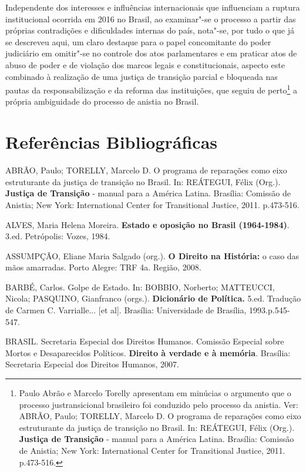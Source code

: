 Independente dos interesses e influências internacionais que influenciam
a ruptura institucional ocorrida em 2016 no Brasil, ao examinar"-se o
processo a partir das próprias contradições e dificuldades internas do
país, nota"-se, por tudo o que já se descreveu aqui, um claro destaque
para o papel concomitante do poder judiciário em omitir"-se no controle
dos atos parlamentares e em praticar atos de abuso de poder e de
violação dos marcos legais e constitucionais, aspecto este combinado à
realização de uma justiça de transição parcial e bloqueada nas pautas da
responsabilização e da reforma das instituições, que seguiu de
perto\footnote{Paulo Abrão e Marcelo Torelly apresentam em minúcias o
  argumento que o processo justransicional brasileiro foi conduzido pelo
  processo da anistia. Ver: ABRÃO, Paulo; TORELLY, Marcelo D. O programa
  de reparações como eixo estruturante da justiça de transição no
  Brasil. In: REÁTEGUI, Félix (Org.). \textbf{Justiça de Transição} -
  manual para a América Latina. Brasília: Comissão de Anistia; New York:
  International Center for Transitional Justice, 2011. p.473-516.} a
própria ambiguidade do processo de anistia no Brasil.

\section{Referências Bibliográficas}

ABRÃO, Paulo; TORELLY, Marcelo D. O programa de reparações como eixo
estruturante da justiça de transição no Brasil. In: REÁTEGUI, Félix
(Org.). \textbf{Justiça de Transição} - manual para a América Latina.
Brasília: Comissão de Anistia; New York: International Center for
Transitional Justice, 2011. p.473-516.

ALVES, Maria Helena Moreira. \textbf{Estado e oposição no Brasil
(1964-1984)}. 3.ed. Petrópolis: Vozes, 1984.

ASSUMPÇÃO, Eliane Maria Salgado (org.). \textbf{O Direito na História:}
o caso das mãos amarradas. Porto Alegre: TRF 4a. Região, 2008.

BARBÉ, Carlos. Golpe de Estado. In: BOBBIO, Norberto; MATTEUCCI, Nicola;
PASQUINO, Gianfranco (orgs.). \textbf{Dicionário de Política.} 5.ed.
Tradução de Carmen C. Varrialle... {[}et al{]}. Brasília: Universidade
de Brasília, 1993.p.545-547.

BRASIL. Secretaria Especial dos Direitos Humanos. Comissão Especial
sobre Mortos e Desaparecidos Políticos. \textbf{Direito à verdade e à
memória}. Brasília: Secretaria Especial dos Direitos Humanos, 2007.

